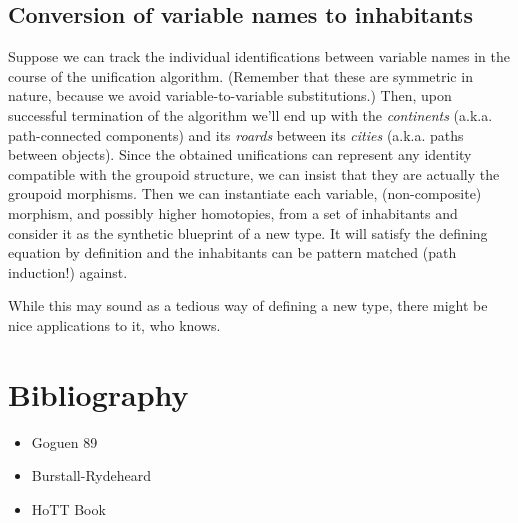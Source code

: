 \documentclass{article}
\begin{document}
\subsection {Conversion of variable names to inhabitants}
Suppose we can track the individual identifications between variable names in the course of the unification algorithm. (Remember that these are symmetric in nature, because we avoid variable-to-variable substitutions.) Then, upon successful termination of the algorithm we'll end up with the \emph {continents} (a.k.a. path-connected components) and its \emph {roards} between its \emph {cities} (a.k.a. paths between objects). Since the obtained unifications can represent any identity compatible with the groupoid structure, we can insist that they are actually the groupoid morphisms. Then we can instantiate each variable, (non-composite) morphism, and possibly higher homotopies, from a set of inhabitants and consider it as the synthetic blueprint of a new type. It will satisfy the defining equation by definition and the inhabitants can be pattern matched (path induction!) against.
\par While this may sound as a tedious way of defining a new type, there might be nice applications to it, who knows.

\section {Bibliography}
\begin{itemize}
\item Goguen 89
\item Burstall-Rydeheard
\item HoTT Book
\end{itemize}
\end{document}

